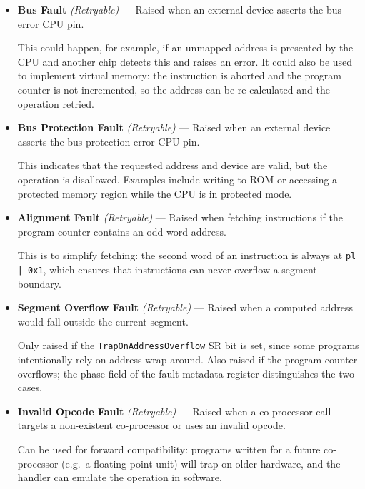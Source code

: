 \begin{itemize}
	\item \textbf{Bus Fault} \textit{(Retryable)} — Raised when an external device asserts the bus error CPU pin.

	      This could happen, for example, if an unmapped address is presented by the CPU and another chip detects this
	      and raises an error. It could also be used to implement virtual memory: the instruction is aborted and the
	      program counter is not incremented, so the address can be re-calculated and the operation retried.

	\item \textbf{Bus Protection Fault} \textit{(Retryable)} — Raised when an external device asserts the bus
	      protection error CPU pin.

	      This indicates that the requested address and device are valid, but the operation is disallowed. Examples
	      include writing to ROM or accessing a protected memory region while the CPU is in protected mode.

	\item \textbf{Alignment Fault} \textit{(Retryable)} — Raised when fetching instructions if the program counter
	      contains an odd word address.

	      This is to simplify fetching: the second word of an instruction is always at \texttt{pl | 0x1}, which
	      ensures that instructions can never overflow a segment boundary.

	\item \textbf{Segment Overflow Fault} \textit{(Retryable)} — Raised when a computed address would fall outside
	      the current segment.

	      Only raised if the \texttt{TrapOnAddressOverflow} SR bit is set, since some programs intentionally rely on
	      address wrap-around. Also raised if the program counter overflows; the phase field of the fault metadata
	      register distinguishes the two cases.

	\item \textbf{Invalid Opcode Fault} \textit{(Retryable)} — Raised when a co-processor call targets a
	      non-existent co-processor or uses an invalid opcode.

	      Can be used for forward compatibility: programs written for a future co-processor (e.g.\ a floating-point
	      unit) will trap on older hardware, and the handler can emulate the operation in software.


\end{itemize}
